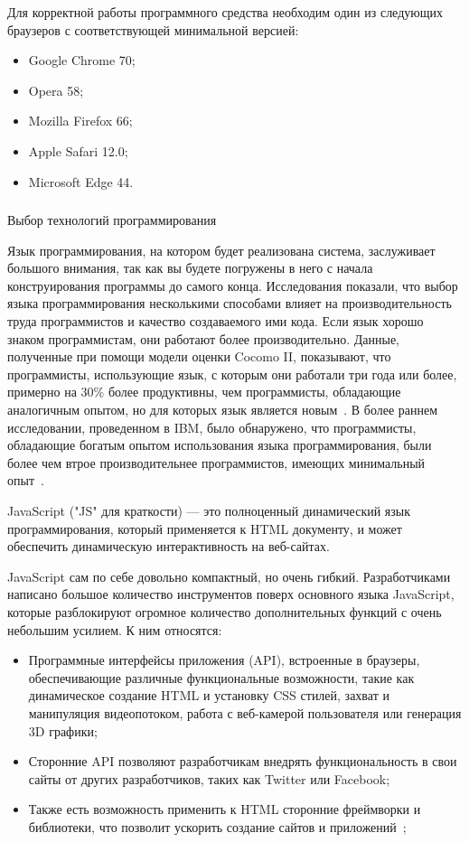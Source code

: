 Для корректной работы программного средства необходим один из следующих браузеров с соответствующей минимальной версией:

\begin{itemize}
	\item Google Chrome 70;
	\item Opera 58;
	\item Mozilla Firefox 66;
	\item Apple Safari 12.0;
	\item Microsoft Edge 44.
\end{itemize}

\subsubsection{} Выбор технологий программирования
\label{sec:analysis:specification:language}

Язык программирования, на котором будет реализована система, заслуживает большого внимания, так как вы будете
погружены в него с начала конструирования программы до самого конца. Исследования показали, что выбор языка
программирования несколькими способами влияет на производительность труда программистов и качество создаваемого ими
кода. Если язык хорошо знаком программистам, они работают более производительно. Данные, полученные при помощи модели
оценки Cocomo II, показывают, что программисты, использующие язык, с которым они работали три года или более, примерно
на 30\% более продуктивны, чем программисты, обладающие аналогичным опытом, но для которых язык является
новым~\cite{software_cost_estimation}. В более раннем исследовании, проведенном в IBM, было обнаружено, что
программисты, обладающие богатым опытом использования языка программирования, были более чем втрое
производительнее программистов, имеющих минимальный опыт~\cite{method_of_programming_measurement_and_estimation}.

JavaScript ("JS" для краткости) — это полноценный динамический язык программирования, который применяется к HTML
документу, и может обеспечить динамическую интерактивность на веб-сайтах.

JavaScript сам по себе довольно компактный, но очень гибкий. Разработчиками написано большое количество инструментов
поверх основного языка JavaScript, которые разблокируют огромное количество дополнительных функций с очень
небольшим усилием. К ним относятся:

\begin{itemize}
	\item Программные интерфейсы приложения (API), встроенные в браузеры, обеспечивающие различные функциональные
	возможности, такие как динамическое создание HTML и установку CSS стилей, захват и манипуляция видеопотоком, работа с
	веб-камерой пользователя или генерация 3D графики;
	\item Сторонние API позволяют разработчикам внедрять функциональ\-ность в свои сайты от других разработчиков,
	таких как Twitter или Facebook;
	\item Также есть возможность применить к HTML сторонние фреймворки и библиотеки, что позволит ускорить создание
	сайтов и приложений~\cite{javascript_basics};
\end{itemize}

